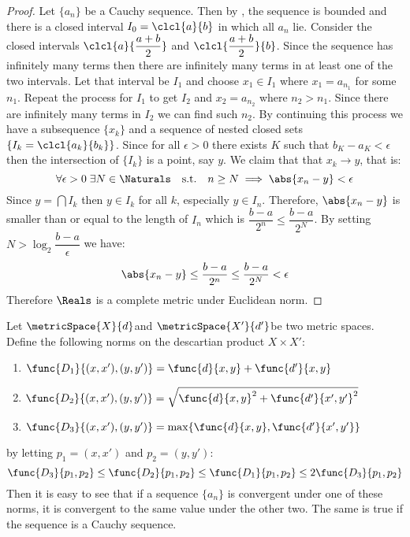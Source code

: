 \begin{proof} \label{RealComplete}
    Let \(\{ a_n \}\) be a Cauchy sequence. Then by , the sequence is bounded and there is a closed interval \(I_0 = \clcl{a}{b} \) in which all \(a_n\) lie. Consider the closed intervals \(\clcl{a}{\dfrac{a + b}{2}} \) and \(\clcl{\dfrac{a + b}{2}}{b}\). Since the sequence has infinitely many terms then there are infinitely many terms in at least one of the two intervals. Let that interval be \(I_1\) and choose \(x_1 \in I_1\) where \(x_1 = a_{n_1}\) for some \(n_1\).
    Repeat the process for \(I_1\) to get \(I_2 \) and \(x_2 = a_{n_2}\) where \(n_2 > n_1\). Since there are infinitely many terms in \(I_2\) we can find such \(n_2\). By continuing this process we have a subsequence \(\{ x_k \}\) and a sequence of nested closed sets \(\{ I_k = \clcl{a_k}{b_k}\}\). Since for all \(\epsilon > 0\) there exists \(K\) such that \(b_K - a_K < \epsilon\) then the intersection of \(\{I_k\}\) is a point, say \(y\). We claim that that \(x_k \to y\), that is:
    \[ \forall \epsilon > 0 \; \exists N \in \Naturals \quad \mathrm{s.t.} \quad n \geq N \implies \abs{x_n - y} < \epsilon \]
    Since \(y = \bigcap{I_k}\) then \(y \in I_k\) for all \(k\), especially \(y \in I_n\). Therefore, \(\abs{x_n - y}\) is smaller than or equal to the length of \(I_n\) which is \(\dfrac{b - a}{2^n} \leq \dfrac{b-a}{2^N}\). By setting \(N > \log_2{\dfrac{b-a}{\epsilon}}\) we have:
    \[\abs{x_n - y} \leq \dfrac{b - a}{2^n} \leq \dfrac{b-a}{2^N} < \epsilon\]
    Therefore \(\Reals\) is a complete metric under Euclidean norm.
\end{proof}


Let \(\metricSpace{X}{d}\)and \(\metricSpace{X'}{d'}\)be two metric spaces. Define the following norms on the descartian product \(X \times X'\):
\begin{enumerate}
    \item \(\func{D_1}{(x,x'),(y,y')} = \func{d}{x,y} + \func{d'}{x,y}\)
    \item \(\func{D_2}{(x,x'),(y,y')} = \sqrt{\func{d}{x,y}^2 +\func{d'}{x',y'}^2}\)
    \item \(\func{D_3}{(x,x'),(y,y')} = \max \{ \func{d}{x,y} , \func{d'}{x',y'}\}\)
\end{enumerate}

by letting \(p_1 = (x,x')\) and \(p_2 = (y,y')\):
\[\func{D_3}{p_1,p_2} \leq \func{D_2}{p_1,p_2} \leq \func{D_1}{p_1,p_2} \leq 2\func{D_3}{p_1,p_2}\]
Then it is easy to see that if a sequence \(\{ a_n \}\) is convergent under one of these norms, it is convergent to the same value under the other two.
The same is true if the sequence is a Cauchy sequence.

